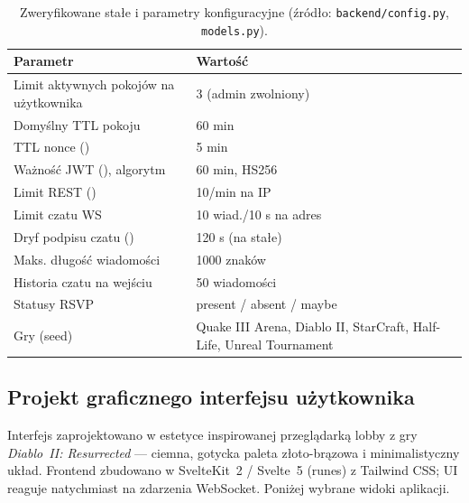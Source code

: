 \renewcommand{\arraystretch}{1.2}
\begin{table}[H]
\centering\small
\begin{tabularx}{\textwidth}{@{}Yl@{}}
\toprule
\textbf{Parametr} & \textbf{Wartość} \\
\midrule
Limit aktywnych pokojów na użytkownika & 3 (admin zwolniony) \\
Domyślny TTL pokoju & 60 min \\
TTL nonce () & 5 min \\
Ważność JWT (), algorytm & 60 min, HS256 \\
Limit REST () & 10/min na IP \\
Limit czatu WS & 10 wiad./10 s na adres \\
Dryf podpisu czatu () & 120 s (na stałe) \\
Maks. długość wiadomości & 1000 znaków \\
Historia czatu na wejściu & 50 wiadomości \\
Statusy RSVP & present / absent / maybe \\
Gry (seed) & Quake III Arena, Diablo II, StarCraft, Half-Life, Unreal Tournament \\
\bottomrule
\end{tabularx}
\caption{Zweryfikowane stałe i parametry konfiguracyjne (źródło: \texttt{backend/config.py}, \texttt{models.py}).}
\label{tab:const}
\end{table}

\subsection{Projekt graficznego interfejsu użytkownika}
\label{sec:gui}

Interfejs zaprojektowano w estetyce inspirowanej przeglądarką lobby z gry
\textit{Diablo~II: Resurrected} — ciemna, gotycka paleta złoto-brązowa i
minimalistyczny układ. Frontend zbudowano w SvelteKit~2 / Svelte~5 (runes) z Tailwind
CSS; UI reaguje natychmiast na zdarzenia WebSocket. Poniżej wybrane widoki aplikacji.

